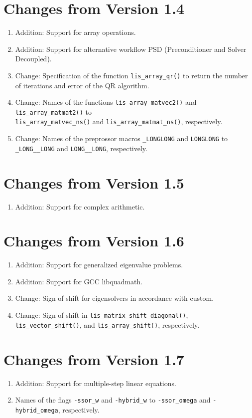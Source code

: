 \documentclass[a4paper]{article}
\begin{document}
\section*{Changes from Version 1.4}
\begin{enumerate}
\item Addition: Support for array operations.
\item Addition: Support for alternative workflow PSD (Preconditioner and Solver
      Decoupled). 
\item Change: Specification of the function 
      {\tt lis\_array\_qr()} to return 
      the number of iterations and error of the QR algorithm. 
\item Change: Names of the functions
      {\tt lis\_array\_matvec2()} and {\tt lis\_array\_matmat2()} to \\
      {\tt lis\_array\_matvec\_ns()} and {\tt lis\_array\_matmat\_ns()}, respectively.
\item Change: Names of the preprossor macros {\tt \_LONGLONG} and 
      {\tt LONGLONG} to {\tt \_LONG\_\_LONG} and {\tt LONG\_\_LONG}, respectively.
\end{enumerate}

\section*{Changes from Version 1.5}
\begin{enumerate}
\item Addition: Support for complex arithmetic.
\end{enumerate}
  
\section*{Changes from Version 1.6}
\begin{enumerate}
\item Addition: Support for generalized eigenvalue problems.
\item Addition: Support for GCC libquadmath.
\item Change: Sign of shift for eigensolvers in accordance with custom.
\item Change: Sign of shift in {\tt lis\_matrix\_shift\_diagonal()}, 
{\tt lis\_vector\_shift()}, and {\tt lis\_array\_shift()}, respectively.
\end{enumerate}
  
\section*{Changes from Version 1.7}
\begin{enumerate}
\item Addition: Support for multiple-step linear equations.
\item Names of the flags {\tt -ssor\_w} and {\tt -hybrid\_w} to {\tt -ssor\_omega}
and {\tt -hybrid\_omega}, respectively.
\end{enumerate}
\end{document}
